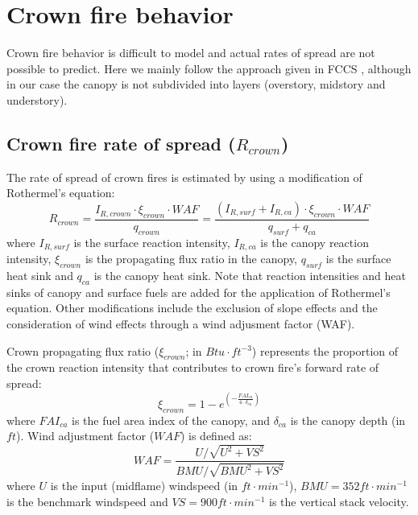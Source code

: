 \documentclass[]{book}
\begin{document}
\hypertarget{crown-fire-behavior}{%
\section{Crown fire behavior}\label{crown-fire-behavior}}

Crown fire behavior is difficult to model and actual rates of spread are not possible to predict. Here we mainly follow the approach given in FCCS \citep{Prichard2013}, although in our case the canopy is not subdivided into layers (overstory, midstory and understory).

\subsection{Crown fire rate of spread ($R_{crown}$)}

The rate of spread of crown fires is estimated by using a modification of Rothermel's equation:
\begin{equation}
R_{crown} = \frac{I_{R,crown} \cdot \xi_{crown}\cdot WAF}{q_{crown}} = \frac{(I_{R,surf}+I_{R,ca}) \cdot \xi_{crown}\cdot WAF}{q_{surf}+q_{ca}}
\end{equation}
where \(I_{R,surf}\) is the surface reaction intensity, \(I_{R,ca}\) is the canopy reaction intensity, \(\xi_{crown}\) is the propagating flux ratio in the canopy, \(q_{surf}\) is the surface heat sink and \(q_{ca}\) is the canopy heat sink. Note that reaction intensities and heat sinks of canopy and surface fuels are added for the application of Rothermel's equation. Other modifications include the exclusion of slope effects and the consideration of wind effects through a wind adjusment factor (WAF).

Crown propagating flux ratio (\(\xi_{crown}\); in \(Btu \cdot ft^{-3}\)) represents the proportion of the crown reaction intensity that contributes to crown fire's forward rate of spread:
\begin{equation}
\xi_{crown} = 1 - e^{\left(-\frac{FAI_{ca}}{4 \cdot \delta_{ca}}\right)}
\end{equation}
where \(FAI_{ca}\) is the fuel area index of the canopy, and \(\delta_{ca}\) is the canopy depth (in \(ft\)). Wind adjustment factor (\(WAF\)) is defined as:
\begin{equation}
WAF = \frac{U/\sqrt{U^2+VS^2}}{BMU/\sqrt{BMU^2+VS^2}}
\end{equation}
where \(U\) is the input (midflame) windspeed (in \(ft \cdot min^{-1}\)), \(BMU = 352 ft \cdot min^{-1}\) is the benchmark windspeed and \(VS = 900 ft \cdot min^{-1}\) is the vertical stack velocity.
\end{document}
